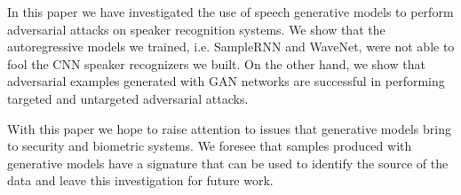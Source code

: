 In this paper we have investigated the use of speech generative models to perform adversarial attacks on speaker recognition systems. We show that the autoregressive models we trained, i.e. SampleRNN and WaveNet, were not able to fool the CNN speaker recognizers we built. On the other hand, we show that adversarial examples generated with GAN networks are successful in performing targeted and untargeted adversarial attacks. 

With this paper we hope to raise attention to issues that generative models bring to security and biometric systems. We foresee that samples produced with generative models have a signature that can be used to identify the source of the data and leave this investigation for future work.
